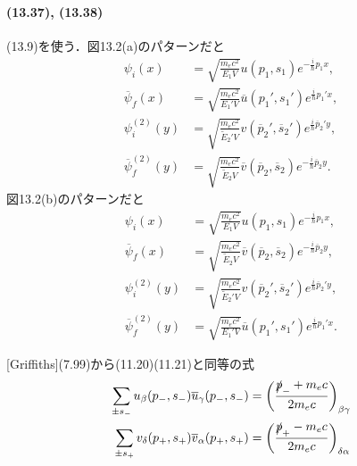 \paragraph{(13.37), (13.38)}
(13.9)を使う．図13.2(a)のパターンだと
\begin{align*}
  \psi_i(x) & = \sqrt{\frac{m_ec^2}{E_1V}} u(p_1, s_1) e^{-\frac{i}{\hbar}p_1x}, \\
  \overline{\psi}_f(x) & = \sqrt{\frac{m_ec^2}{E_1'V}} \overline{u}(p_1', s_1') e^{\frac{i}{\hbar}p_1'x}, \\
  \psi_i^{(2)}(y) & = \sqrt{\frac{m_ec^2}{\tilde{E}_2'V}} v(\overline{p}_2', \overline{s}_2') e^{\frac{i}{\hbar}\overline{p}_2'y}, \\
  \overline{\psi}_f^{(2)}(y) & = \sqrt{\frac{m_ec^2}{\tilde{E}_2V}} \overline{v}(\overline{p}_2, \overline{s}_2) e^{-\frac{i}{\hbar}\overline{p}_2y}.
\end{align*}
図13.2(b)のパターンだと
\begin{align*}
  \psi_i(x) & = \sqrt{\frac{m_ec^2}{E_1V}} u(p_1, s_1) e^{-\frac{i}{\hbar}p_1x}, \\
  \overline{\psi}_f(x) & = \sqrt{\frac{m_ec^2}{\tilde{E}_2V}} \overline{v}(\overline{p}_2, \overline{s}_2) e^{-\frac{i}{\hbar}\overline{p}_2y}, \\
  \psi_i^{(2)}(y) & = \sqrt{\frac{m_ec^2}{\tilde{E}_2'V}} v(\overline{p}_2', \overline{s}_2') e^{\frac{i}{\hbar}\overline{p}_2'y}, \\
  \overline{\psi}_f^{(2)}(y) & = \sqrt{\frac{m_ec^2}{E_1'V}} \overline{u}(p_1', s_1') e^{\frac{i}{\hbar}p_1'x}.
\end{align*}

[Griffiths](7.99)から(11.20)(11.21)と同等の式
\begin{align*}
  \sum_{\pm s_-} u_\beta(p_-, s_-) \overline{u}_\gamma(p_-,s_-) & = \left( \frac{\slashed{p}_- + m_ec}{2m_ec} \right)_{\beta\gamma} \\
  \sum_{\pm s_+} v_\delta(p_+, s_+) \overline{v}_\alpha(p_+,s_+) & = \left( \frac{\slashed{p}_+ - m_ec}{2m_ec} \right)_{\delta\alpha}
\end{align*}

